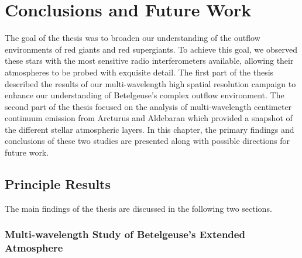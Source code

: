 \chapter{Conclusions and Future Work}
\label{chap:8}

The goal of the thesis was to broaden our understanding of the outflow environments of red giants and red supergiants. To achieve this goal, we observed these stars with the most sensitive radio interferometers available, allowing their atmospheres to be probed with exquisite detail. The first part of the thesis described the results of our multi-wavelength high spatial resolution campaign to enhance our understanding of Betelgeuse's complex outflow environment. The second part of the thesis focused on the analysis of multi-wavelength centimeter continuum emission from Arcturus and Aldebaran which provided a snapshot of the different stellar atmospheric layers. In this chapter, the primary findings and conclusions of these two studies are presented along with possible directions for future work.

\pagebreak

\section{Principle Results}\label{sec:8.1}
The main findings of the thesis are discussed in the following two sections.
\subsection{Multi-wavelength Study of Betelgeuse's Extended Atmosphere}\label{sec:8.1.1}

